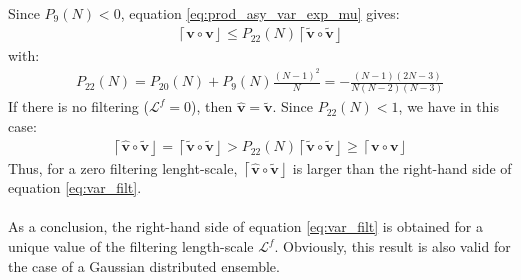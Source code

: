 \documentclass[12pt]{scrartcl}
\begin{document}
Since $P_9(N) < 0$, equation \eqref{eq:prod_asy_var_exp_mu} gives:
\begin{align}
\left\lceil \mathbf{v} \circ \mathbf{v} \right\rfloor \le P_{22}(N) \left\lceil\widetilde{\mathbf{v}} \circ \widetilde{\mathbf{v}}\right\rfloor
\end{align}
with:
\begin{align}
P_{22}(N) = P_{20}(N) + P_9(N) \frac{(N-1)^2}{N} = -\frac{(N-1)(2N-3)}{N(N-2)(N-3)}
\end{align}
If there is no filtering ($\mathcal{L}^f=0$), then $\widehat{\mathbf{v}} = \widetilde{\mathbf{v}}$. Since $P_{22}(N) < 1$, we have in this case:
\begin{align}
\left\lceil\widehat{\mathbf{v}} \circ \widetilde{\mathbf{v}}\right\rfloor = \left\lceil\widetilde{\mathbf{v}} \circ \widetilde{\mathbf{v}}\right\rfloor > P_{22}(N) \left\lceil\widetilde{\mathbf{v}} \circ \widetilde{\mathbf{v}}\right\rfloor \ge \left\lceil \mathbf{v} \circ \mathbf{v} \right\rfloor
\end{align}
Thus, for a zero filtering lenght-scale, $\left\lceil\widehat{\mathbf{v}} \circ \widetilde{\mathbf{v}}\right\rfloor$ is larger than the right-hand side of equation \eqref{eq:var_filt}.\\
$  $\\
As a conclusion, the right-hand side of equation \eqref{eq:var_filt} is obtained for a unique value of the filtering length-scale $\mathcal{L}^f$. Obviously, this result is also valid for the case of a Gaussian distributed ensemble.
\end{document}
